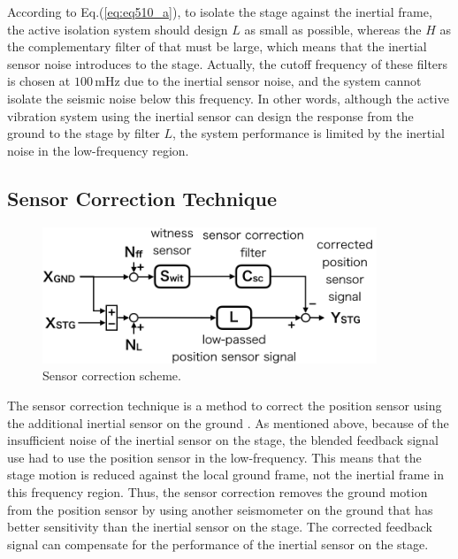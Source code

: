 According to Eq.(\ref{eq:eq510_a}), to isolate the stage against the inertial frame, the active isolation system should design $L$ as small as possible, whereas the $H$ as the complementary filter of that must be large, which means that the inertial sensor noise introduces to the stage. Actually, the cutoff frequency of these filters is chosen at $100\,\mathrm{mHz}$ due to the inertial sensor noise, and the system cannot isolate the seismic noise below this frequency. In other words, although the active vibration system using the inertial sensor can design the response from the ground to the stage by filter $L$, the system performance is limited by the inertial noise in the low-frequency region.

\subsection{Sensor Correction Technique} \label{sec:sec513}
\begin{figure}[h]
  \begin{center}   
    \includegraphics[width=10cm]{./img_chap5/img505.png}
    \caption{Sensor correction scheme.} \label{img:img505}
  \end{center}
\end{figure}
The sensor correction technique is a method to correct the position sensor using the additional inertial sensor on the ground \cite{hua2005low}. As mentioned above, because of the insufficient noise of the inertial sensor on the stage, the blended feedback signal use had to use the position sensor in the low-frequency. This means that the stage motion is reduced against the local ground frame, not the inertial frame in this frequency region. Thus, the sensor correction removes the ground motion from the position sensor by using another seismometer on the ground that has better sensitivity than the inertial sensor on the stage. The corrected feedback signal can compensate for the performance of the inertial sensor on the stage.

